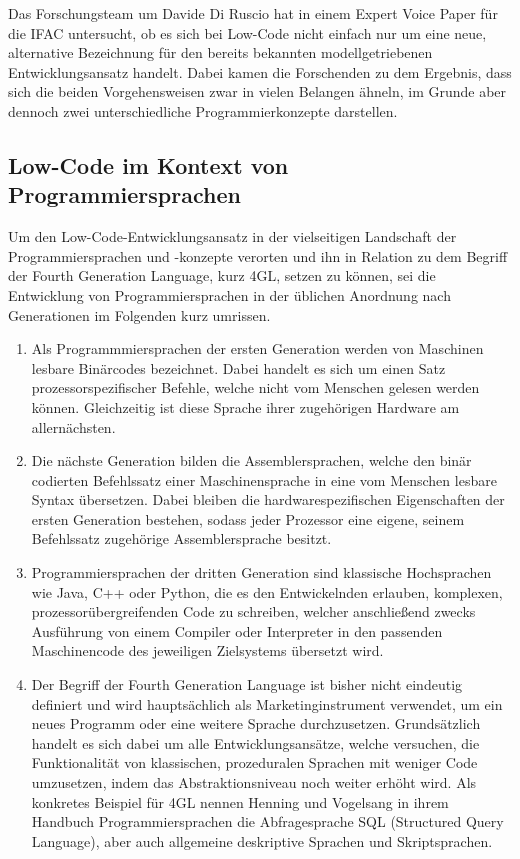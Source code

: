 \documentclass[acmtog, language=ngerman]{acmart}
\begin{document}
Das Forschungsteam um Davide Di Ruscio hat in einem Expert Voice Paper für die IFAC untersucht, ob es sich bei Low-Code nicht einfach nur um eine neue, alternative Bezeichnung für den bereits bekannten modellgetriebenen Entwicklungsansatz handelt. Dabei kamen die Forschenden zu dem Ergebnis, dass sich die beiden Vorgehensweisen zwar in vielen Belangen ähneln, im Grunde aber dennoch zwei unterschiedliche Programmierkonzepte darstellen. \cite{low_code_vs_mdd}

\subsection{Low-Code im Kontext von Programmiersprachen}
Um den Low-Code-Entwicklungsansatz in der vielseitigen Landschaft der Programmiersprachen und -konzepte verorten und ihn in Relation zu dem Begriff der Fourth Generation Language, kurz 4GL, setzen zu können, sei die Entwicklung von Programmiersprachen in der üblichen Anordnung nach Generationen im Folgenden kurz umrissen.

\begin{enumerate}
    \item Als Programmmiersprachen der ersten Generation werden von Maschinen lesbare Binärcodes bezeichnet. Dabei handelt es sich um einen Satz prozessorspezifischer Befehle, welche nicht vom Menschen gelesen werden können. Gleichzeitig ist diese Sprache ihrer zugehörigen Hardware am allernächsten.
    \item Die nächste Generation bilden die Assemblersprachen, welche den binär codierten Befehlssatz einer Maschinensprache in eine vom Menschen lesbare Syntax übersetzen. Dabei bleiben die hardwarespezifischen Eigenschaften der ersten Generation bestehen, sodass jeder Prozessor eine eigene, seinem Befehlssatz zugehörige Assemblersprache besitzt.
    \item Programmiersprachen der dritten Generation sind klassische Hochsprachen wie Java, C++ oder Python, die es den Entwickelnden erlauben, komplexen, prozessorübergreifenden Code zu schreiben, welcher anschließend zwecks Ausführung von einem Compiler oder Interpreter in den passenden Maschinencode des jeweiligen Zielsystems übersetzt wird.
    \item Der Begriff der Fourth Generation Language ist bisher nicht eindeutig definiert und wird hauptsächlich \glqq als Marketinginstrument verwendet, um ein neues Programm oder eine weitere Sprache durchzusetzen\grqq. \cite{handbuch_programmiersprachen} Grundsätzlich handelt es sich dabei um alle Entwicklungsansätze, welche versuchen, die Funktionalität von klassischen, prozeduralen Sprachen mit weniger Code umzusetzen, indem das Abstraktionsniveau noch weiter erhöht wird. Als konkretes Beispiel für 4GL nennen Henning und Vogelsang in ihrem Handbuch Programmiersprachen die Abfragesprache SQL (Structured Query Language), aber auch allgemeine deskriptive Sprachen und Skriptsprachen.
\end{enumerate}
\end{document}
